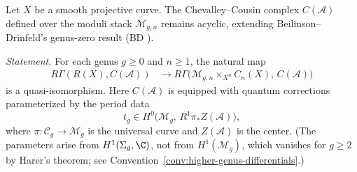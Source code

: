 \begin{theorem}\label{thm:CC-acyclicity-higher-genus}
\label{thm:chevalley-cousin}
\label{thm:BD-extension-higher-genus}
Let $X$ be a smooth projective curve. The Chevalley--Cousin complex $C(\mathcal{A})$ 
defined over the moduli stack $\mathcal{M}_{g,n}$ remains acyclic, extending 
Beilinson--Drinfeld's genus-zero result (BD \cite[Theorem 3.4.12]{BD04}).

\emph{Statement.} For each genus $g \geq 0$ and $n \geq 1$, the natural map
\[
\begin{aligned}
R\Gamma(R(X), C(\mathcal{A}))
&\to R\Gamma\bigl(\mathcal{M}_{g,n} \times_{X^n} C_n(X),\, C(\mathcal{A})\bigr)
\end{aligned}
\]
is a quasi-isomorphism. Here $C(\mathcal{A})$ is equipped with quantum
corrections parameterized by the period data
\[
t_g \in H^0\!\bigl(\mathcal{M}_g,\, R^1\pi_* Z(\mathcal{A})\bigr),
\]
where $\pi \colon \mathcal{C}_g \to \mathcal{M}_g$ is the universal curve and $Z(\mathcal{A})$ is the center.  (The parameters arise from $H^1(\Sigma_g, \C)$, not from $H^1(\mathcal{M}_g)$, which vanishes for $g \geq 2$ by Harer's theorem; see Convention~\ref{conv:higher-genus-differentials}.)
\end{theorem}

